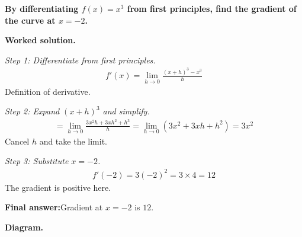\documentclass[11pt]{article}
\newcommand{\question}[1]{\par\medskip\noindent\textbf{#1}\par}
\begin{document}
\question{By differentiating \( f(x) = x^3 \) from first principles, find the gradient of the curve at \( x = -2 \).}

\textbf{Worked solution.}

\textit{Step 1: Differentiate from first principles.}
\[\begin{gathered}
f'(x) = \lim_{h \to 0} \frac{(x+h)^3 - x^3}{h}
\end{gathered}\]
Definition of derivative.

\textit{Step 2: Expand \( (x+h)^3 \) and simplify.}
\[\begin{gathered}
= \lim_{h \to 0} \frac{3x^2h + 3xh^2 + h^3}{h} = \lim_{h \to 0}(3x^2 + 3xh + h^2) = 3x^2
\end{gathered}\]
Cancel \( h \) and take the limit.

\textit{Step 3: Substitute \( x = -2 \).}
\[\begin{gathered}
f'(-2) = 3(-2)^2 = 3 \times 4 = 12
\end{gathered}\]
The gradient is positive here.

\begin{answerbox}
\textbf{Final answer:}\quad Gradient at \(\displaystyle  x = -2 \) is \(\displaystyle  12 \).
\end{answerbox}
\textbf{Diagram.}
\end{document}
